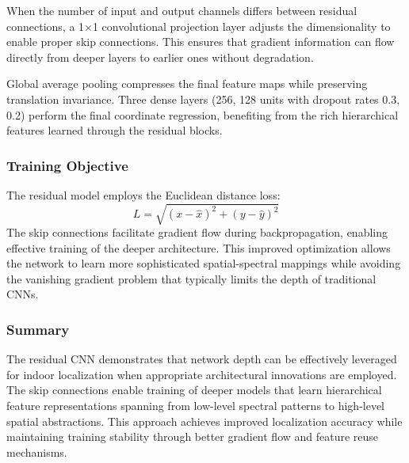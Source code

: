 When the number of input and output channels differs between residual connections, a 1×1 convolutional projection layer adjusts the dimensionality to enable proper skip connections. This ensures that gradient information can flow directly from deeper layers to earlier ones without degradation.

Global average pooling compresses the final feature maps while preserving translation invariance. Three dense layers (256, 128 units with dropout rates 0.3, 0.2) perform the final coordinate regression, benefiting from the rich hierarchical features learned through the residual blocks.

\subsubsection{Training Objective}
The residual model employs the Euclidean distance loss:
\[
L = \sqrt{(x - \hat{x})^2 + (y - \hat{y})^2}
\]
The skip connections facilitate gradient flow during backpropagation, enabling effective training of the deeper architecture. This improved optimization allows the network to learn more sophisticated spatial-spectral mappings while avoiding the vanishing gradient problem that typically limits the depth of traditional CNNs.

\subsubsection{Summary}
The residual CNN demonstrates that network depth can be effectively leveraged for indoor localization when appropriate architectural innovations are employed. The skip connections enable training of deeper models that learn hierarchical feature representations spanning from low-level spectral patterns to high-level spatial abstractions. This approach achieves improved localization accuracy while maintaining training stability through better gradient flow and feature reuse mechanisms.


